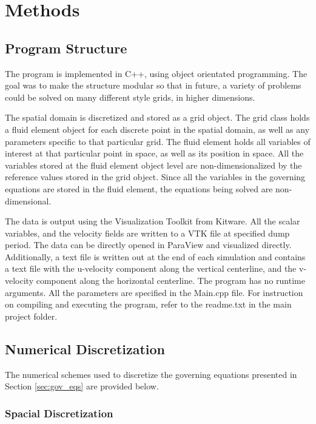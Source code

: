 
\chapter{Methods}

\section{Program Structure}
\label{sec:prog_struct}

The program is implemented in C++, using object orientated programming.  The goal was to make the structure modular so that in future, a variety of problems could be solved on many different style grids, in higher dimensions.

The spatial domain is discretized and stored as a grid object.  The grid class holds a fluid element object for each discrete point in the spatial domain, as well as any parameters specific to that particular grid.  The fluid element holds all variables of interest at that particular point in space, as well as its position in space.  All the variables stored at the fluid element object level are non-dimensionalized by the reference values stored in the grid object.  Since all the variables in the governing equations are stored in the fluid element, the equations being solved are non-dimensional.  

The data is output using the Visualization Toolkit from Kitware.  All the scalar variables, and the velocity fields are written to a VTK file at specified dump period.  The data can be directly opened in ParaView and visualized directly.  Additionally, a text file is written out at the end of each simulation and contains a text file with the u-velocity component along the vertical centerline, and the v-velocity component along the horizontal centerline.  The program has no runtime arguments.  All the parameters are specified in the Main.cpp file. For instruction on compiling and executing the program, refer to the readme.txt in the main project folder.

\section{Numerical Discretization}
\label{sec:num_disc}

The numerical schemes used to discretize the governing equations presented in Section \ref{sec:gov_eqs} are provided below.

	\subsection{Spacial Discretization}

